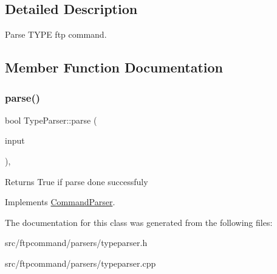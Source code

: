 \subsection{Detailed Description}
Parse T\+Y\+PE ftp command. 

\subsection{Member Function Documentation}
\mbox{\label{classTypeParser_afc5fc9fbf55f8ecec885312dd396a353}} 
\subsubsection{\texorpdfstring{parse()}{parse()}}
{\footnotesize\ttfamily bool Type\+Parser\+::parse (\begin{DoxyParamCaption}\item[{const Q\+String \&}]{input }\end{DoxyParamCaption})\hspace{0.3cm}{\ttfamily [override]}, {\ttfamily [virtual]}}

\begin{DoxyReturn}{Returns}
True if parse done successfuly 
\end{DoxyReturn}


Implements \hyperlink{classCommandParser_a5ed0855947a9b4500329f29b8123f2ea}{Command\+Parser}.



The documentation for this class was generated from the following files\+:\begin{DoxyCompactItemize}
\item 
src/ftpcommand/parsers/typeparser.\+h\item 
src/ftpcommand/parsers/typeparser.\+cpp\end{DoxyCompactItemize}
